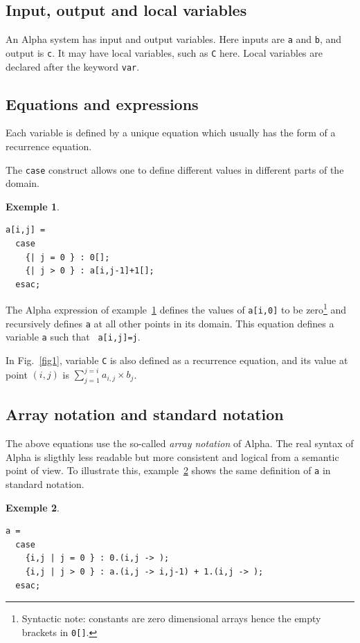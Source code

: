 \documentclass[12pt]{article}
\newcommand{\Alpha}{{\sc Alpha}}
\newcommand{\alfa}{\Alpha}
\newtheorem{ex}{Exemple}[section]
\begin{document}
\subsection*{Input, output and local variables}
An \alfa{} system has input and output variables. 
Here inputs are \texttt{a} and \texttt{b}, and output
is \texttt{c}.
It may have local
variables, such as \texttt{C} here. Local variables are
declared after the keyword \texttt{var}.

\subsection*{Equations and expressions}
Each variable is defined by a unique equation which
usually has the form of a recurrence equation. 

The {\tt case}
construct allows one to define different values in different parts of
the domain.

\begin{ex}{~}
\begin{verbatim}
a[i,j] = 
  case
    {| j = 0 } : 0[];
    {| j > 0 } : a[i,j-1]+1[];
  esac;
\end{verbatim}
\label{ex2} 
\end{ex}

The {\Alpha} expression of example~\ref{ex2} defines the values of
\texttt{a[i,0]} to be zero\footnote{Syntactic note: constants are zero
dimensional arrays hence the empty brackets in \texttt{0[]}.}
and recursively defines {\tt a} at all other points in its
domain. This equation defines a variable {\tt a} such that {\tt
a[i,j]=j}. 

In Fig.~\ref{fig1}, variable \texttt{C} is also defined as
a recurrence equation, and its value at point $(i,j)$ 
is $\sum_{j=1}^{j=i} a_{i,j} \times b_{j}$.

\subsection{Array notation and standard notation}
The above equations use the so-called 
{\em array notation} of \alfa{}. 
The
real syntax of {\Alpha} is sligthly less readable but more consistent
and logical from a semantic point of view. To illustrate this,
example~\ref{ex3} shows the same definition of {\tt a} in standard
notation.
\begin{ex}{~}
\begin{verbatim}
a = 
  case
    {i,j | j = 0 } : 0.(i,j -> );
    {i,j | j > 0 } : a.(i,j -> i,j-1) + 1.(i,j -> );
  esac;
\end{verbatim}
\label{ex3}
\end{ex}
\end{document}
